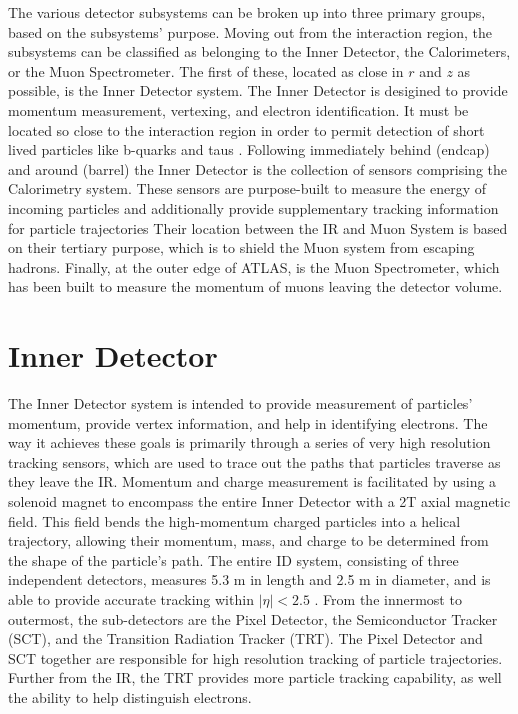     The various detector subsystems can be broken up into three primary groups, based on the subsystems' purpose.
    Moving out from the interaction region, the subsystems can be classified as belonging to the Inner Detector, the Calorimeters, or the Muon Spectrometer.
    The first of these, located as close in $r$ and $z$ as possible, is the Inner Detector system.
    The Inner Detector is desigined to provide momentum measurement, vertexing, and electron identification.
    It must be located so close to the interaction region in order to permit detection of short lived particles like b-quarks and taus \cite{CERN-LHCC-97-016}.
    Following immediately behind (endcap) and around (barrel) the Inner Detector is the collection of sensors comprising the Calorimetry system.
    These sensors are purpose-built to measure the energy of incoming particles and additionally provide supplementary tracking information for particle trajectories
    Their location between the IR and Muon System is based on their tertiary purpose, which is to shield the Muon system from escaping hadrons.
    Finally, at the outer edge of ATLAS, is the Muon Spectrometer, which has been built to measure the momentum of muons leaving the detector volume.
    




\section{Inner Detector} %
    
    The Inner Detector system is intended to provide measurement of particles' momentum, provide vertex information, and help in identifying electrons.
    The way it achieves these goals is primarily through a series of very high resolution tracking sensors, which are used to trace out the paths that particles traverse as they leave the IR. 
    Momentum and charge measurement is facilitated by using a solenoid magnet to encompass the entire Inner Detector with a 2T axial magnetic field.
    This field bends the high-momentum charged particles into a helical trajectory, allowing their momentum, mass, and charge to be determined from the shape of the particle's path.
    The entire ID system, consisting of three independent detectors, measures 5.3 m in length and 2.5 m in diameter, and is able to provide accurate tracking within $|\eta| < 2.5$ \cite{id_tdr}.
    From the innermost to outermost, the sub-detectors are the Pixel Detector, the Semiconductor Tracker (SCT), and the Transition Radiation Tracker (TRT).
    The Pixel Detector and SCT together are responsible for high resolution tracking of particle trajectories.
    Further from the IR, the TRT provides more particle tracking capability, as well the ability to help distinguish electrons. 


